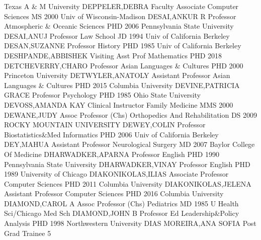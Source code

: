 \documentclass[
]{article}
\begin{document}
Texas A \& M University \textbar{}  \textbar DEPPELER,DEBRA
\textbar Faculty Associate \textbar Computer Sciences \textbar MS 2000
Univ of Wisconsin-Madison \textbar{}  \textbar DESAI,ANKUR R
\textbar Professor \textbar Atmospheric \& Oceanic Sciences \textbar PHD
2006 Pennsylvania State University \textbar{} 
\textbar DESAI,ANUJ \textbar Professor \textbar Law School \textbar JD
1994 Univ of California Berkeley \textbar{} 
\textbar DESAN,SUZANNE \textbar Professor \textbar History \textbar PHD
1985 Univ of California Berkeley \textbar{} 
\textbar DESHPANDE,ABBISHEK \textbar Visiting Asst Prof
\textbar Mathematics \textbar PHD 2018 \textbar{} 
\textbar DETCHEVERRY,CHARO \textbar Professor \textbar Asian Languages
\& Cultures \textbar PHD 2000 Princeton University \textbar{}
 \textbar DETWYLER,ANATOLY \textbar Assistant Professor
\textbar Asian Languages \& Cultures \textbar PHD 2015 Columbia
University \textbar{}  \textbar DEVINE,PATRICIA GRACE
\textbar Professor \textbar Psychology \textbar PHD 1985 Ohio State
University \textbar{}  \textbar DEVOSS,AMANDA KAY
\textbar Clinical Instructor \textbar Family Medicine \textbar MMS 2000
\textbar{}  \textbar DEWANE,JUDY \textbar Assoc Professor
(Chs) \textbar Orthopedics And Rehabilitation \textbar DS 2009 ROCKY
MOUNTAIN UNIVERSITY \textbar{}  \textbar DEWEY,COLIN
\textbar Professor \textbar Biostatistics\&Med Informatics \textbar PHD
2006 Univ of California Berkeley \textbar{} 
\textbar DEY,MAHUA \textbar Assistant Professor \textbar Neurological
Surgery \textbar MD 2007 Baylor College Of Medicine \textbar{}
 \textbar DHARWADKER,APARNA \textbar Professor
\textbar English \textbar PHD 1990 Pennsylvania State University
\textbar{}  \textbar DHARWADKER,VINAY \textbar Professor
\textbar English \textbar PHD 1989 University of Chicago \textbar{}
 \textbar DIAKONIKOLAS,ILIAS \textbar Associate Professor
\textbar Computer Sciences \textbar PHD 2011 Columbia University
\textbar{}  \textbar DIAKONIKOLAS,JELENA \textbar Assistant
Professor \textbar Computer Sciences \textbar PHD 2016 Columbia
University \textbar{}  \textbar DIAMOND,CAROL A
\textbar Assoc Professor (Chs) \textbar Pediatrics \textbar MD 1985 U
Health Sci/Chicago Med Sch \textbar{}  \textbar DIAMOND,JOHN
B \textbar Professor \textbar Ed Leadership\&Policy Analysis
\textbar PHD 1998 Northwestern University \textbar{} 
\textbar DIAS MOREIRA,ANA SOFIA \textbar Post Grad Trainee 5
\end{document}

